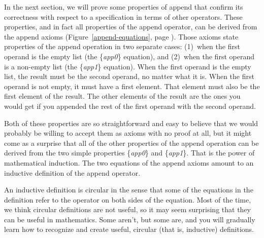In the next section, we will prove some properties of append
that confirm its correctness with respect to a specification in terms of other operators.
These properties, and in fact all properties of the append operator,
can be derived from the append axioms (Figure~\ref{append-equations}, page \pageref{append-equations}).
Those axioms state properties of the append operation in two separate cases:
(1)~when the first operand is the empty list (the \{\emph{app0}\} equation), and
(2)~when the first operand is a non-empty list (the \{\emph{app1}\} equation).
When the first operand is the empty list,
the result must be the second operand, no matter what it is.
When the first operand is not empty, it must have a first element.
That element must also be the first element of the result.
The other elements of the result are the ones you would get
if you appended the rest of the first operand with the second operand.

Both of these properties are so straightforward and easy to believe
that we would probably be willing to accept them as axioms with no proof at all,
but it might come as a surprise that all of the other properties
of the append operation can be derived from
the two simple properties \{\emph{app0}\} and \{\emph{app1}\}.
That is the power of mathematical induction.
The two equations of the append axioms
amount to an inductive definition of the append operator.

An inductive definition is circular in the sense
that some of the equations in the definition refer
to the operator on both sides of the equation.
Most of the time, we think circular definitions are not useful,
so it may seem surprising that they can be useful in mathematics.
Some aren't, but some are, and you will
gradually learn how to recognize and create useful,
circular (that is, inductive) definitions.

